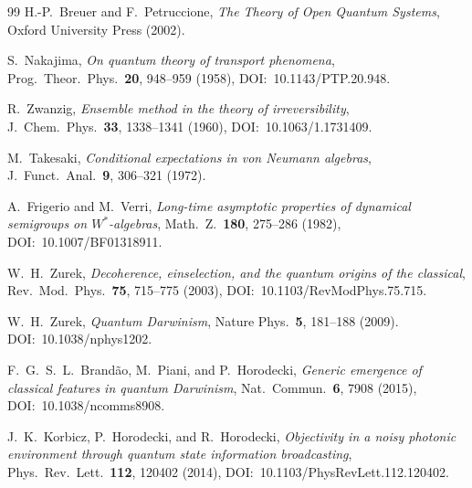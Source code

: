 \documentclass[12pt]{article}
\theoremstyle{definition}
\theoremstyle{remark}
\begin{document}
\begin{thebibliography}{99}
H.-P.~Breuer and F.~Petruccione,
\emph{The Theory of Open Quantum Systems},
Oxford University Press (2002).

S.~Nakajima,
\emph{On quantum theory of transport phenomena},
Prog.\ Theor.\ Phys.\ \textbf{20}, 948--959 (1958), DOI:~10.1143/PTP.20.948.

R.~Zwanzig,
\emph{Ensemble method in the theory of irreversibility},
J.\ Chem.\ Phys.\ \textbf{33}, 1338--1341 (1960), DOI:~10.1063/1.1731409.

M.~Takesaki,
\emph{Conditional expectations in von Neumann algebras},
J.\ Funct.\ Anal.\ \textbf{9}, 306--321 (1972).

A.~Frigerio and M.~Verri,
\emph{Long-time asymptotic properties of dynamical semigroups on \(W^*\)-algebras},
Math.\ Z.\ \textbf{180}, 275--286 (1982), DOI:~10.1007/BF01318911.

W.~H.~Zurek,
\emph{Decoherence, einselection, and the quantum origins of the classical},
Rev.\ Mod.\ Phys.\ \textbf{75}, 715--775 (2003), DOI:~10.1103/RevModPhys.75.715.

W.~H.~Zurek,
\emph{Quantum Darwinism},
Nature Phys.\ \textbf{5}, 181--188 (2009). DOI:~10.1038/nphys1202.

F.~G.~S.~L.~Brand\~ao, M.~Piani, and P.~Horodecki,
\emph{Generic emergence of classical features in quantum Darwinism},
Nat.\ Commun.\ \textbf{6}, 7908 (2015), DOI:~10.1038/ncomms8908.

J.~K.~Korbicz, P.~Horodecki, and R.~Horodecki,
\emph{Objectivity in a noisy photonic environment through quantum state information broadcasting},
Phys.\ Rev.\ Lett.\ \textbf{112}, 120402 (2014), DOI:~10.1103/PhysRevLett.112.120402.

\end{thebibliography}
\end{document}
